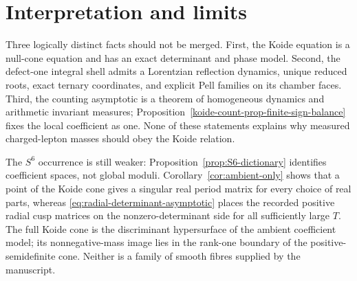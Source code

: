 \documentclass[11pt]{article}
\numberwithin{equation}{section}
\theoremstyle{definition}
\theoremstyle{remark}
\begin{document}


\section{Interpretation and limits}

Three logically distinct facts should not be merged.  First, the Koide equation is a null-cone equation and has an exact determinant and phase model.  Second, the defect-one integral shell admits a Lorentzian reflection dynamics, unique reduced roots, exact ternary coordinates, and explicit Pell families on its chamber faces.  Third, the counting asymptotic is a theorem of homogeneous dynamics and arithmetic invariant measures; Proposition~\ref{koide-count-prop-finite-sign-balance} fixes the local coefficient as one.  None of these statements explains why measured charged-lepton masses should obey the Koide relation.

The $S^6$ occurrence is still weaker: Proposition~\ref{prop:S6-dictionary} identifies coefficient spaces, not global moduli.  Corollary~\ref{cor:ambient-only} shows that a point of the Koide cone gives a singular real period matrix for every choice of real parts, whereas \eqref{eq:radial-determinant-asymptotic} places the recorded positive radial cusp matrices on the nonzero-determinant side for all sufficiently large $T$.  The full Koide cone is the discriminant hypersurface of the ambient coefficient model; its nonnegative-mass image lies in the rank-one boundary of the positive-semidefinite cone.  Neither is a family of smooth fibres supplied by the manuscript.



\end{document}
